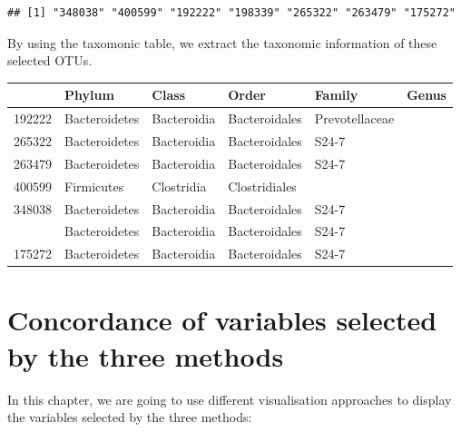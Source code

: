 \documentclass[openany]{book}
\newenvironment{Shaded}{\begin{snugshade}}{\end{snugshade}}
\newcommand{\KeywordTok}[1]{\textcolor[rgb]{0.13,0.29,0.53}{\textbf{#1}}}
\newcommand{\DataTypeTok}[1]{\textcolor[rgb]{0.13,0.29,0.53}{#1}}
\newcommand{\DecValTok}[1]{\textcolor[rgb]{0.00,0.00,0.81}{#1}}
\newcommand{\StringTok}[1]{\textcolor[rgb]{0.31,0.60,0.02}{#1}}
\newcommand{\OperatorTok}[1]{\textcolor[rgb]{0.81,0.36,0.00}{\textbf{#1}}}
\newcommand{\NormalTok}[1]{#1}
\begin{document}
\begin{verbatim}
## [1] "348038" "400599" "192222" "198339" "265322" "263479" "175272"
\end{verbatim}

By using the taxomonic table, we extract the taxonomic information of
these selected OTUs.

\begin{Shaded}
\end{Shaded}

\begin{tabular}{llllll}
\toprule
  & Phylum & Class & Order & Family & Genus\\
\midrule
192222 & Bacteroidetes & Bacteroidia & Bacteroidales & Prevotellaceae & \\
265322 & Bacteroidetes & Bacteroidia & Bacteroidales & S24-7 & \\
263479 & Bacteroidetes & Bacteroidia & Bacteroidales & S24-7 & \\
400599 & Firmicutes & Clostridia & Clostridiales &  & \\
348038 & Bacteroidetes & Bacteroidia & Bacteroidales & S24-7 & \\
\addlinespace
198339 & Bacteroidetes & Bacteroidia & Bacteroidales & S24-7 & \\
175272 & Bacteroidetes & Bacteroidia & Bacteroidales & S24-7 & \\
\bottomrule
\end{tabular}

\chapter{Concordance of variables selected by the three
methods}\label{comparison}

In this chapter, we are going to use different visualisation approaches
to display the variables selected by the three methods:
\end{document}
